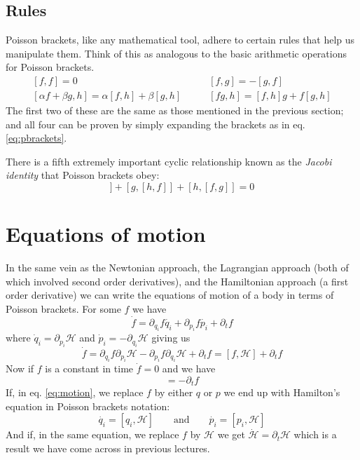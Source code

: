 \documentclass[english,seminar,headertitle]{lecture}
\newcommand{\ham}{\mathscr{H}}
\begin{document}
\subsection{Rules}
Poisson brackets, like any mathematical tool, adhere to certain rules that help us manipulate them. Think of this as analogous to the basic arithmetic operations for Poisson brackets.
\begin{equation}
\begin{array}{ll}
	[f,f] = 0 \quad & \quad [f,g] = -[g,f] \\[1em]
	\left[\alpha f + \beta g, h\right] = \alpha [f, h] + \beta [g,h] \quad & \quad [fg,h] = [f,h]g + f[g,h]
\end{array} \label{eq:rules}
\end{equation}%
The first two of these are the same as those mentioned in the previous section; and all four can be proven by simply expanding the brackets as in eq. \eqref{eq:pbrackets}.

There is a fifth extremely important cyclic relationship known as the \textit{Jacobi identity} that Poisson brackets obey:
\begin{equation}
	[f,[g,h]] + [g,[h,f]] + [h,[f,g]] = 0 \label{eq:jacobi-identity}
\end{equation}

\section{Equations of motion}

In the same vein as the Newtonian approach, the Lagrangian approach (both of which involved second order derivatives), and the Hamiltonian approach (a first order derivative) we can write the equations of motion of a body in terms of Poisson brackets. For some $f$ we have
$$
\dot{f} = \partial_{q_i} f \dot{q_i} + \partial_{p_i} f \dot{p_i} + \partial_t f
$$
where $\dot{q}_i = \partial_{p_i} \ham$ and $\dot{p}_i = - \partial_{q_i} \ham$ giving us
\begin{equation}
\dot{f} = \partial_{q_i} f \partial_{p_i} \ham - \partial_{p_i} f \partial_{q_i} \ham + \partial_t f = [f,\ham] + \partial_t f \label{eq:dotted}
\end{equation}%
Now if $f$ is a constant in time $\dot{f} = 0$ and we have
\begin{equation}
	[f,\ham] = -\partial_t f \label{eq:motion}
\end{equation}%
If, in eq. \eqref{eq:motion}, we replace $f$ by either $q$ or $p$ we end up with Hamilton's equation in Poisson brackets notation:
$$
\dot{q_i} = [q_i,\ham] \qquad\textrm{and}\qquad \dot{p_i} = [p_i,\ham]
$$
And if, in the same equation, we replace $f$ by $\ham$ we get $\dot{\ham} = \partial_t \ham$ which is a result we have come across in previous lectures.
\end{document}
